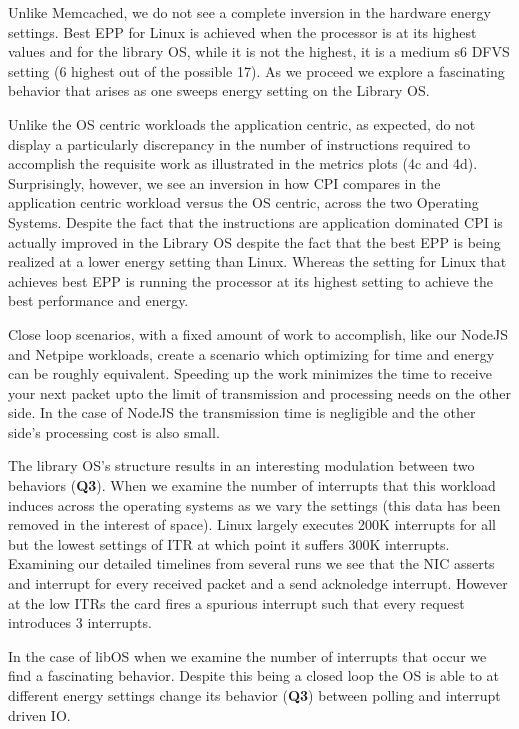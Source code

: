 Unlike Memcached, we do not see a complete inversion in the hardware energy settings.  
Best EPP for Linux is achieved when the processor is at its highest values and for the library OS, while it is not the highest, it is a medium s6 DFVS setting (6 highest out of the possible 17). 
As we proceed we explore a fascinating behavior that arises as one sweeps energy setting on the Library OS.

Unlike the OS centric workloads the application centric, as expected, do not display a particularly discrepancy in the number of instructions required to accomplish the requisite work as illustrated in the metrics plots (4c and 4d).  
Surprisingly, however, we see an inversion in how CPI compares in the application centric workload versus the OS centric, across the two Operating Systems.  
Despite the fact that the instructions are application dominated CPI is actually improved in the Library OS despite the fact that the best EPP is being realized at a lower energy setting than Linux.  
Whereas the setting for Linux that achieves best EPP is running the processor at its highest setting to achieve the best performance and energy.

Close loop scenarios, with a fixed amount of work to accomplish, like  our NodeJS and Netpipe workloads, create a scenario which optimizing for time and energy can be roughly equivalent.  
Speeding up the work minimizes the time to receive your next packet upto the limit of transmission and processing needs on the other side.  In the case of NodeJS the transmission time is negligible and the other side's processing cost is also small.   


The library OS's structure results in an interesting modulation between two behaviors ({\bf Q3}).  
When we examine the number of interrupts that this workload induces across the operating systems as we vary the settings (this data has been removed in the interest of space).  
Linux largely executes 200K interrupts for all but the lowest settings of ITR at which point it suffers 300K interrupts.  
Examining our detailed timelines from several runs we see that the NIC asserts and interrupt for every received packet and a send acknoledge interrupt.  
However at the low ITRs the card fires a spurious interrupt such that every request introduces 3 interrupts. 

In the case of libOS when we examine the number of interrupts that occur we find a fascinating behavior.  
Despite this being a closed loop the OS is able to at different energy settings change its behavior ({\bf Q3}) between polling and interrupt driven IO.  

